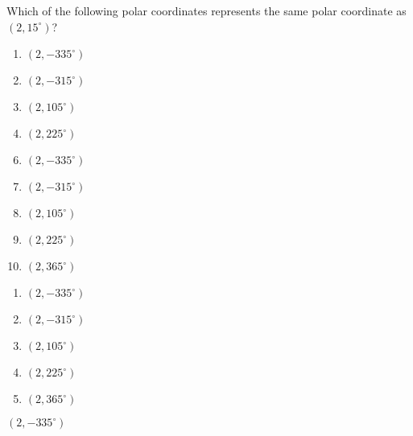 


 Which of the following polar coordinates represents the same polar coordinate as $(2,15^\circ)$?


\ifsat
	\begin{enumerate}[label=\Alph*)]
		\item    $(2,-335^\circ)$ %
		\item  $(2,-315^\circ)$
		\item $(2,105^\circ)$
		\item $(2,225^\circ)$
	\end{enumerate}
\else
\fi

\ifacteven
	\begin{enumerate}[label=\textbf{\Alph*.},itemsep=\fill,align=left]
		\setcounter{enumii}{5}
		\item    $(2,-335^\circ)$ %
		\item  $(2,-315^\circ)$
		\item $(2,105^\circ)$
		\addtocounter{enumii}{1}
		\item $(2,225^\circ)$
		\item  $(2,365^\circ)$
	\end{enumerate}
\else
\fi

\ifactodd
	\begin{enumerate}[label=\textbf{\Alph*.},itemsep=\fill,align=left]
		\item    $(2,-335^\circ)$ %
		\item  $(2,-315^\circ)$
		\item $(2,105^\circ)$
		\item $(2,225^\circ)$
		\item  $(2,365^\circ)$
	\end{enumerate}
\else
\fi

\ifgridin
    $(2,-335^\circ)$ %
		
\else
\fi


